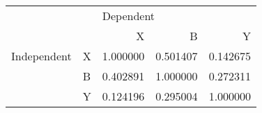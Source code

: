 \begin{tabular}{llrrr}
\toprule
            &   & \multicolumn{3}{l}{Dependent} \\
            &   &         X &         B &         Y \\
\midrule
Independent & X &  1.000000 &  0.501407 &  0.142675 \\
            & B &  0.402891 &  1.000000 &  0.272311 \\
            & Y &  0.124196 &  0.295004 &  1.000000 \\
\bottomrule
\end{tabular}
